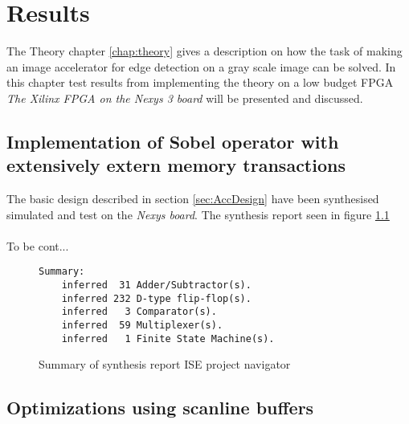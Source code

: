 \chapter{Results}
The Theory chapter \ref{chap:theory} gives a description on how the task of making an image accelerator for edge detection on a gray scale image can be solved. In this chapter test results from implementing the theory on a low budget FPGA \textit{The Xilinx FPGA on the Nexys 3 board} will be presented and discussed.  

\section{Implementation of Sobel operator with extensively extern memory transactions}
The basic design described in section \ref{sec:AccDesign} have been synthesised simulated and test on the \textit{Nexys board}. The synthesis report seen in figure \ref{fig:sum_synthesis_report}\\
\\
To be cont...  

\begin{figure}[H]
\centering
\begin{BVerbatim}
Summary:
    inferred  31 Adder/Subtractor(s).
    inferred 232 D-type flip-flop(s).
    inferred   3 Comparator(s).
    inferred  59 Multiplexer(s).
    inferred   1 Finite State Machine(s).
\end{BVerbatim}
\caption{Summary of synthesis report ISE project navigator}
\label{fig:sum_synthesis_report}
\end{figure}

\section{Optimizations using scanline buffers}
